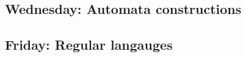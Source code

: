 \newpage
\subsection*{Wednesday: Automata constructions}



\newpage
\subsection*{Friday: Regular langauges}



